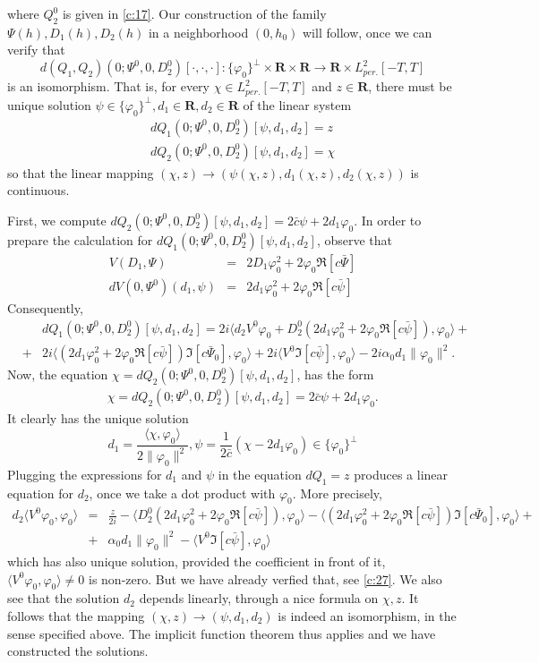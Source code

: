 \documentclass[12pt]{amsart}
\theoremstyle{definition}
\theoremstyle{remark}
\numberwithin{equation}{section}
\renewcommand{\(}{\left(}
\renewcommand{\)}{\right)}
\renewcommand{\[}{\left[}
\renewcommand{\]}{\right]}
\newcommand{\f}[2]{\frac{#1}{#2}}
\newcommand{\al}{\alpha}
\newcommand{\vp}{\varphi}
\newcommand{\rone}{\mathbf R}
\newcommand{\dpr}[2]{\langle #1,#2 \rangle}
\begin{document}
 where $Q_2^0$ is given in \eqref{c:17}.
 Our construction of the family $\Psi(h), D_1(h), D_2(h)$ in a neighborhood $(0,h_0)$ will follow, once we can verify that
 $$
 d(Q_1, Q_2)(0; \Psi^0, 0, D_2^0)[\cdot, \cdot, \cdot]:  \{\vp_0\}^\perp \times \rone\times \rone \to \rone\times L^2_{per.}[-T,T]
 $$
 is an isomorphism. That is, for every $\chi\in L^2_{per.}[-T,T]$ and $z\in \rone$, there must
 be unique solution $\psi\in \{\vp_0\}^\perp, d_1 \in \rone, d_2\in \rone$  of the linear system
 \begin{eqnarray*}
 & & dQ_1(0; \Psi^0, 0, D_2^0)[\psi, d_1, d_2]=z \\
 & & dQ_2(0; \Psi^0, 0, D_2^0)[\psi, d_1, d_2]=\chi
 \end{eqnarray*}
 so that the linear mapping $(\chi, z)\to (\psi(\chi, z), d_1(\chi, z), d_2(\chi, z))$ is continuous.

 First, we compute $dQ_2(0; \Psi^0, 0, D_2^0)[\psi, d_1, d_2]= 2\bar{c} \psi + 2 d_1 \vp_0$.
 In order to prepare the calculation for $ dQ_1(0; \Psi^0,0, D_2^0)[\psi, d_1, d_2]$, observe that
 \begin{eqnarray*}
V(D_1, \Psi) &=& 2 D_1 \vp_0^2+2\vp_0 \Re[c\bar{\Psi}] \\
dV(0,\Psi^0)(d_1, \psi)  &=& 2 d_1 \vp_0^2+2\vp_0 \Re[c\bar{\psi}]
 \end{eqnarray*}
 Consequently,
  \begin{eqnarray*}
  	 & & dQ_1(0; \Psi^0,0, D_2^0)[\psi, d_1, d_2] =  2i\dpr{d_2 V^0\vp_0+ D_2^0(2 d_1\vp_0^2+2\vp_0\Re[c\bar{\psi}])}{\vp_0}+ \\
  	 &+& 2i\dpr{(2 d_1 \vp_0^2+2\vp_0\Re[c\bar{\psi}]) \Im[c\bar{\Psi}_0]}{\vp_0} +2i \dpr{V^0 \Im[c\bar{\psi}]}{\vp_0} - 2i \al_0 d_1 \|\vp_0\|^2.
  \end{eqnarray*}
 Now, the equation $\chi=dQ_2(0; \Psi^0, 0, D_2^0)[\psi, d_1, d_2]$, has the form
 \begin{eqnarray*}
 & &\chi=  dQ_2(0; \Psi^0, 0, D_2^0)[\psi, d_1, d_2]= 2\bar{c} \psi + 2 d_1 \vp_0.
 \end{eqnarray*}
  It clearly has the unique solution
  $$
  d_1=\f{\dpr{\chi}{\vp_0}}{2\|\vp_0\|^2}, \psi=\f{1}{2\bar{c}}(\chi- 2d_1 \vp_0)\in \{\vp_0\}^\perp
  $$
   Plugging the expressions for $d_1$ and $\psi$ in the   equation $dQ_1=z$  produces a linear equation for $d_2$, once we take a dot product with $\vp_0$.  More precisely,
   \begin{eqnarray*}
  d_2 \dpr{V^0\vp_0}{\vp_0} &=&   \f{z}{2i} -\dpr{D_2^0(2 d_1\vp_0^2+2\vp_0\Re[c\bar{\psi}])}{\vp_0} -  \dpr{(2 d_1 \vp_0^2+2\vp_0\Re[c\bar{\psi}]) \Im[c\bar{\Psi}_0]}{\vp_0} +\\
  &+& \al_0 d_1 \|\vp_0\|^2 - \dpr{V^0 \Im[c\bar{\psi}]}{\vp_0}
   \end{eqnarray*}
   which has also unique solution, provided the coefficient in front of it, $\dpr{V^0 \vp_0}{\vp_0}\neq 0$  is non-zero. But we have already verfied that, see \eqref{c:27}. We also see that the solution $d_2$ depends linearly,  through a nice formula on $\chi, z$. It follows that the mapping $(\chi, z)\to (\psi, d_1, d_2)$ is indeed an isomorphism, in the sense specified above.  The implicit function theorem thus applies and we have constructed the solutions.
\end{document}
